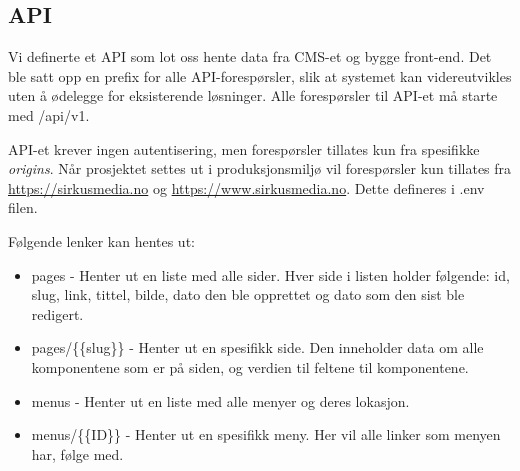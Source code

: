 \subsection{API}
Vi definerte et API som lot oss hente data fra CMS-et og bygge front-end. Det ble satt opp en prefix for alle API-forespørsler, slik at systemet kan videreutvikles uten å ødelegge for eksisterende løsninger. Alle forespørsler til API-et må starte med /api/v1.

API-et krever ingen autentisering, men forespørsler tillates kun fra spesifikke \textit{origins}. Når prosjektet settes ut i produksjonsmiljø vil forespørsler kun tillates fra \url{https://sirkusmedia.no} og \url{https://www.sirkusmedia.no}. Dette defineres i .env filen.

Følgende lenker kan hentes ut:
\begin{itemize}
  \item pages - Henter ut en liste med alle sider. Hver side i listen holder følgende: id, slug, link, tittel, bilde, dato den ble opprettet og dato som den sist ble redigert.
  \item pages/\{\{slug\}\} - Henter ut en spesifikk side. Den inneholder data om alle komponentene som er på siden, og verdien til feltene til komponentene.
  \item menus - Henter ut en liste med alle menyer og deres lokasjon.
  \item menus/\{\{ID\}\} - Henter ut en spesifikk meny. Her vil alle linker som menyen har, følge med.
\end{itemize}

